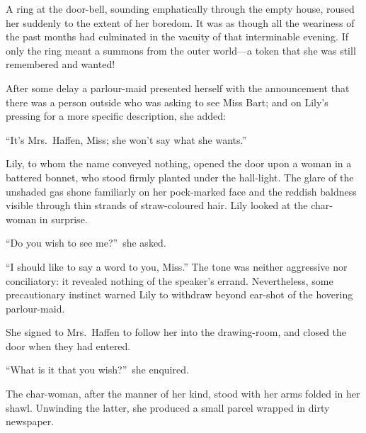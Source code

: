 \documentclass[12pt,a4paper]{book}
\begin{document}
A ring at the door-bell, sounding emphatically through the empty
house, roused her suddenly to the extent of her boredom. It was
as though all the weariness of the past months had culminated in
the vacuity of that interminable evening. If only the ring meant
a summons from the outer world---a token that she was still
remembered and wanted!





After some delay a parlour-maid presented herself with the
announcement that there was a person outside who was asking to
see Miss Bart; and on Lily's pressing for a more specific
description, she added:\  



``It's Mrs.\ Haffen, Miss; she won't say what she wants.''





Lily, to whom the name conveyed nothing, opened the door upon a
woman in a battered bonnet, who stood firmly planted under the
hall-light. The glare of the unshaded gas shone familiarly on her
pock-marked face and the reddish baldness visible through thin
strands of straw-coloured hair. Lily looked at the char-woman in
surprise.





``Do you wish to see me?''\ she asked.





``I should like to say a word to you, Miss.'' The tone was
neither aggressive nor conciliatory: it revealed nothing of the
speaker's errand. Nevertheless, some precautionary instinct
warned Lily to withdraw beyond ear-shot of the hovering
parlour-maid.





She signed to Mrs.\ Haffen to follow her into the drawing-room,
and closed the door when they had entered.





``What is it that you wish?''\ she enquired.





The char-woman, after the manner of her kind, stood with her arms
folded in her shawl. Unwinding the latter, she produced a small
parcel wrapped in dirty newspaper.
\end{document}
